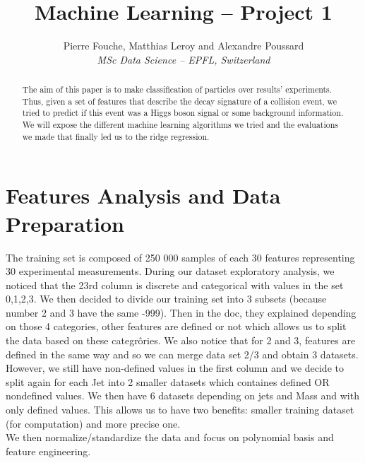 \documentclass[10pt,conference,compsocconf]{IEEEtran}
\begin{document}
\title{Machine Learning -- Project 1}

\author{
  Pierre Fouche, Matthias Leroy and Alexandre Poussard\\
  \textit{MSc Data Science -- EPFL, Switzerland}
}

\maketitle

\begin{abstract}
  The aim of this paper is to make classification of particles over results' experiments. Thus, given a set of features that describe the decay signature of a collision event, we tried to predict if this event was a Higgs boson signal or some background information. We will expose the different machine learning algorithms we tried and the evaluations we made that finally led us to the ridge regression.
\end{abstract}

\section{Features Analysis and Data Preparation}

The training set is composed of 250 000 samples of each 30 features representing 30 experimental measurements. During our dataset exploratory analysis, we noticed that the 23rd column is discrete and categorical with values in the set {0,1,2,3}. We then decided to divide our training set into 3 subsets (because number 2 and 3 have the same -999). Then in the doc, they explained depending on those 4 categories, other features are defined or not which allows us to split the data based on these categrôries. We also notice that for 2 and 3, features are defined in the same way and so we can merge data set 2/3 and obtain 3 datasets. 
However, we still have non-defined values in the first column and we decide to split again for each Jet into 2 smaller datasets which containes defined OR nondefined values.
We then have 6 datasets depending on jets and Mass and with only defined values. This allows us to have two benefits: smaller training dataset (for computation) and more precise one. \\

We then normalize/standardize the data and focus on polynomial basis and feature engineering. \\
\end{document}

